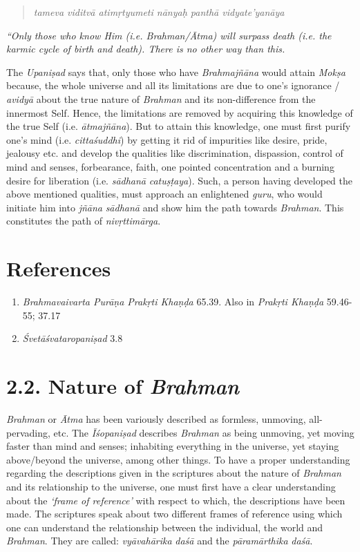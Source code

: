 \begin{verse}\emph{tameva viditvā atimṛtyumeti nānyaḥ panthā vidyate'yanāya }\end{verse}

\emph{``Only those who know Him (i.e. Brahman/Ātma) will surpass death (i.e. the karmic cycle of birth and death). There is no other way than this.}

The \emph{Upaniṣad} says that, only those who have \emph{Brahmajñāna} would attain \emph{Mokṣa} because, the whole universe and all its limitations are due to one's ignorance / \emph{avidyā} about the true nature of \emph{Brahman} and its non-difference from the innermost Self. Hence, the limitations are removed by acquiring this knowledge of the true Self (i.e. \emph{ātmajñāna}). But to attain this knowledge, one must first purify one's mind (i.e. \emph{cittaśuddhi}) by getting it rid of impurities like desire, pride, jealousy etc. and develop the qualities like discrimination, dispassion, control of mind and senses, forbearance, faith, one pointed concentration and a burning desire for liberation (i.e. \emph{sādhanā} \emph{catuṣṭaya}). Such, a person having developed the above mentioned qualities, must approach an enlightened \emph{guru}, who would initiate him into \emph{jñāna} \emph{sādhanā} and show him the path towards \emph{Brahman}. This constitutes the path of \emph{nivṛttimārga}.

\section*{References}

\begin{enumerate}
\itemsep=0pt
\item
  \emph{Brahmavaivarta Purāṇa Prakṛti Khaṇḍa} 65.39. Also in \emph{Prakṛti Khaṇḍa} 59.46-55; 37.17
\item
  \emph{Śvetāśvataropaniṣad} 3.8
\end{enumerate}

\section*{2.2. Nature of \emph{Brahman}}

\emph{Brahman} or \emph{Ātma} has been variously described as formless, unmoving, all-pervading, etc. The \emph{Īśopaniṣad} describes \emph{Brahman} as being unmoving, yet moving faster than mind and senses; inhabiting everything in the universe, yet staying above/beyond the universe, among other things. To have a proper understanding regarding the descriptions given in the scriptures about the nature of \emph{Brahman} and its relationship to the universe, one must first have a clear understanding about the \emph{`frame of reference'} with respect to which, the descriptions have been made. The scriptures speak about two different frames of reference using which one can understand the relationship between the individual, the world and \emph{Brahman}. They are called: \emph{vyāvahārika} \emph{daśā} and the \emph{pāramārthika} \emph{daśā}.

